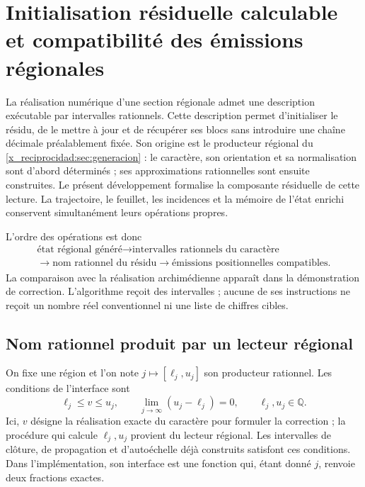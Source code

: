 
\section{Initialisation résiduelle calculable et compatibilité des émissions régionales}
\label{sec:residuo-regional-computable}

La réalisation numérique d'une section régionale admet une description
exécutable par intervalles rationnels. Cette description permet d'initialiser
le résidu, de le mettre à jour et de récupérer ses blocs sans introduire une chaîne
décimale préalablement fixée. Son origine est le producteur régional du
\cref{x_reciprocidad:sec:generacion} : le caractère,
son orientation et sa normalisation sont d'abord déterminés ; ses approximations
rationnelles sont ensuite construites. Le présent développement formalise la composante résiduelle de cette
lecture. La trajectoire, le feuillet, les incidences et la mémoire de l'état
enrichi conservent simultanément leurs opérations propres.

L'ordre des opérations est donc
\[
 \begin{gathered}
 \text{état régional généré}
 \longrightarrow \text{intervalles rationnels du caractère}
 \\
 \longrightarrow \text{nom rationnel du résidu}
 \longrightarrow \text{émissions positionnelles compatibles}.
 \end{gathered}
\]
La comparaison avec la réalisation archimédienne apparaît dans la démonstration
de correction. L'algorithme reçoit des intervalles ; aucune de ses instructions
ne reçoit un nombre réel conventionnel ni une liste de chiffres cibles.

\subsection{Nom rationnel produit par un lecteur régional}
\label{subsec:residual-nombre-racional}

On fixe une région et l'on note \(j\mapsto[\ell_j,u_j]\) son producteur
rationnel. Les conditions de l'interface sont
\begin{equation}
 \ell_j\leq v\leq u_j,\qquad
 \lim_{j\to\infty}(u_j-\ell_j)=0,
 \qquad \ell_j,u_j\in\mathbb Q.
 \label{eq:residual-contrato-productor}
\end{equation}
Ici, \(v\) désigne la réalisation exacte du caractère pour formuler la
correction ; la procédure qui calcule \(\ell_j,u_j\) provient du lecteur
régional. Les intervalles de clôture, de propagation et d'autoéchelle déjà
construits satisfont ces conditions. Dans l'implémentation, son interface
est une fonction qui, étant donné \(j\), renvoie deux fractions exactes.

